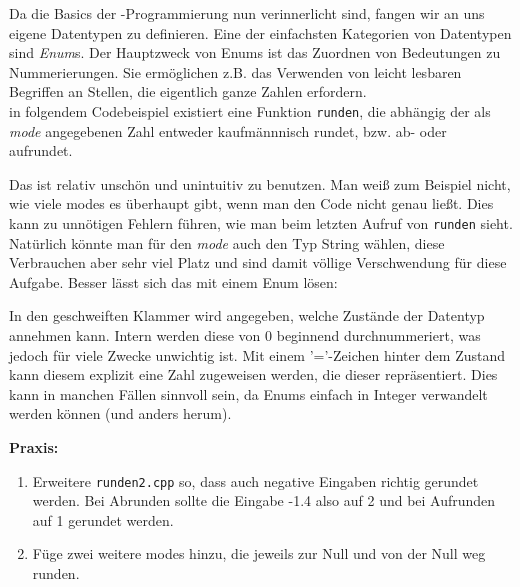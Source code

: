 
Da die Basics der \Cpp-Programmierung nun verinnerlicht sind, fangen wir an uns eigene Datentypen zu definieren.
Eine der einfachsten Kategorien von Datentypen sind \emph{Enum}s. Der Hauptzweck von Enums ist das Zuordnen von Bedeutungen zu Nummerierungen.
Sie ermöglichen z.B. das Verwenden von leicht lesbaren Begriffen an Stellen, die eigentlich ganze Zahlen erfordern. \\
in folgendem Codebeispiel existiert eine Funktion \texttt{runden}, die abhängig der als \emph{mode} angegebenen Zahl entweder kaufmännnisch rundet, bzw. ab- oder aufrundet.


Das ist relativ unschön und unintuitiv zu benutzen. Man weiß zum Beispiel nicht, wie viele modes es überhaupt gibt, wenn man den Code nicht genau ließt. Dies kann zu unnötigen Fehlern führen, wie man beim letzten Aufruf von \texttt{runden} sieht. Natürlich könnte man für den \emph{mode} auch den Typ String wählen, diese Verbrauchen aber sehr viel Platz und sind damit völlige Verschwendung für diese Aufgabe. Besser lässt sich das mit einem Enum lösen:


In den geschweiften Klammer wird angegeben, welche Zustände der Datentyp annehmen kann.
Intern werden diese von 0 beginnend durchnummeriert, was jedoch für viele Zwecke unwichtig ist.
Mit einem '='-Zeichen hinter dem Zustand kann diesem explizit eine Zahl zugeweisen werden, die dieser repräsentiert.
Dies kann in manchen Fällen sinnvoll sein, da Enums einfach in Integer verwandelt werden können (und anders herum).

\textbf{Praxis:}
\begin{enumerate}
    \item Erweitere \texttt{runden2.cpp} so, dass auch negative Eingaben richtig gerundet werden. Bei Abrunden sollte die Eingabe -1.4 also auf 2 und bei Aufrunden auf 1 gerundet werden.
    \item Füge zwei weitere modes hinzu, die jeweils zur Null und von der Null weg runden.
\end{enumerate}
